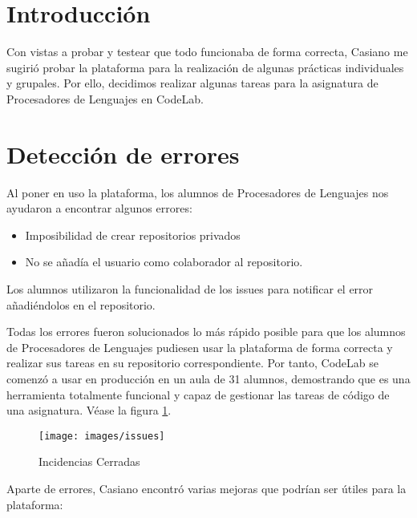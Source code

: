 
\section{Introducción}
\label{4:sec1}

Con vistas a probar y testear que todo funcionaba de forma correcta, Casiano me sugirió probar la plataforma para la realización de algunas prácticas individuales y grupales.
Por ello, decidimos realizar algunas tareas para la asignatura de Procesadores de Lenguajes en CodeLab.

\section{Detección de errores}
\label{4:sec2}

Al poner en uso la plataforma, los alumnos de Procesadores de Lenguajes nos ayudaron a encontrar algunos errores:

\begin{itemize}
    \item Imposibilidad de crear repositorios privados
    \item No se añadía el usuario como colaborador al repositorio.
\end{itemize}

Los alumnos utilizaron la funcionalidad de los issues para notificar el error añadiéndolos en el repositorio.

Todas los errores fueron solucionados lo más rápido posible para que los alumnos de Procesadores de Lenguajes pudiesen usar la plataforma de forma correcta y realizar sus tareas en su repositorio correspondiente.
Por tanto, CodeLab se comenzó a usar en producción en un aula de 31 alumnos, demostrando que es una herramienta totalmente funcional y capaz de gestionar las tareas de código de una asignatura.
Véase la figura \ref{fig:issues}.

\begin{figure}[!th]
\begin{center}
\texttt{[image: images/issues]}
\caption{Incidencias Cerradas }
\label{fig:issues}
\end{center}
\end{figure}

\newpage

Aparte de errores, Casiano encontró varias mejoras que podrían ser útiles para la plataforma:

